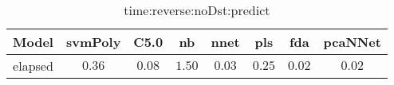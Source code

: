 \begin{table}[!ht]
	\centering
	\begin{tabular}{|c|c|c|c|c|c|c|c|}
		\hline
		Model & svmPoly & C5.0 & nb & nnet & pls & fda & pcaNNet \\ \hline
		elapsed & $0.36$ & $0.08$ & $1.50$ & $0.03$ & $0.25$ & $0.02$ & $0.02$ \\ \hline
	\end{tabular}
	\caption{time:reverse:noDst:predict}
	\label{tab:time:reverse:noDst:predict}
\end{table}
